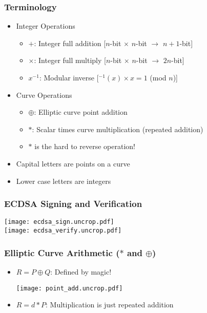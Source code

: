 \documentclass{beamer}
\begin{document}
\begin{frame}
  \frametitle{Terminology}

  \begin{itemize}
  \item Integer Operations
    \begin{itemize}
    \item $+$: Integer full addition [$n$-bit $\times$ $n$-bit
      $\rightarrow$ $n+1$-bit]
    \item $\times$: Integer full multiply [$n$-bit $\times$ $n$-bit
      $\rightarrow$ $2n$-bit]
    \item $x^{-1}$: Modular inverse [$^{-1}(x) \times x = 1$ (mod $n$)]
    \end{itemize}
  \item Curve Operations
    \begin{itemize}
    \item $\oplus$: Elliptic curve point addition
    \item $*$: Scalar times curve multiplication (repeated addition)
    \item $*$ is the hard to reverse operation!
    \end{itemize}
  \item Capital letters are points on a curve
  \item Lower case letters are integers
  \end{itemize}
\end{frame}

\begin{frame}
  \frametitle{ECDSA Signing and Verification}

  \begin{center}
    \begin{multicols}{2}
      \texttt{[image: ecdsa\_sign.uncrop.pdf]} \\
      \texttt{[image: ecdsa\_verify.uncrop.pdf]} \\
    \end{multicols}
  \end{center}
\end{frame}

\begin{frame}
  \frametitle{Elliptic Curve Arithmetic ($*$ and $\oplus$)}

  \begin{itemize}
  \item $R = P\oplus Q$: Defined by magic!
    \begin{center}
      \texttt{[image: point\_add.uncrop.pdf]}
    \end{center}
  \item $R = d*P$: Multiplication is just repeated addition
  \end{itemize}
\end{frame}
\end{document}
